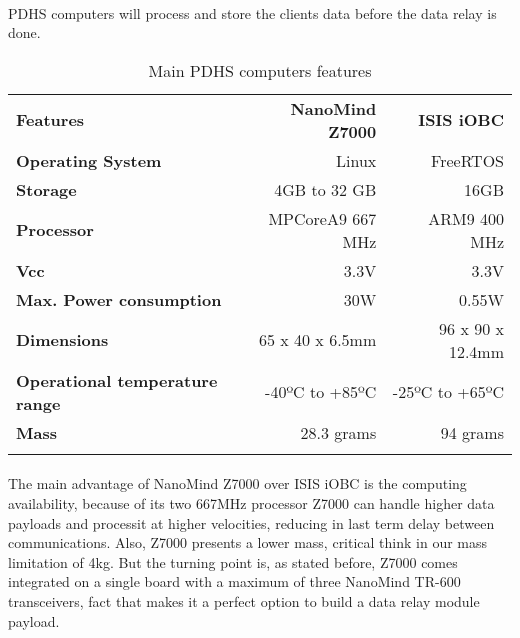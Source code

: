 \paragraph{} PDHS computers will process and store the clients data before the data relay is done.

\begin{longtable}{| l | r | r |}
	
	\hline
	\rowcolor[gray]{0.60} \multicolumn{3}{|c|}{\textbf{PDHS computers options}}\\
	\hline
		
	\hline
	\rowcolor[gray]{0.75}	\textbf{Features} &  \textbf{NanoMind Z7000} & \textbf{ISIS iOBC} \\
	\hline
		
	\cellcolor[gray]{0.85} \textbf{Operating System} & Linux  & FreeRTOS\\
	\cellcolor[gray]{0.85} \textbf{Storage} & 4GB to 32 GB& 16GB\\
	\cellcolor[gray]{0.85} \textbf{Processor} & MPCoreA9 667 MHz& ARM9 400 MHz\\
	\cellcolor[gray]{0.85} \textbf{Vcc} & 3.3V&3.3V \\
	\cellcolor[gray]{0.85} \textbf{Max. Power consumption} & 30W& 0.55W\\
	\cellcolor[gray]{0.85} \textbf{Dimensions} & 65 x 40 x 6.5mm & 96 x 90 x 12.4mm\\
	\cellcolor[gray]{0.85} \textbf{Operational temperature range} & -40ºC to +85ºC & -25ºC to +65ºC\\
	\cellcolor[gray]{0.85} \textbf{Mass} & 28.3 grams&94 grams \\
	\hline
		
		\caption{Main PDHS computers features}
		\label{computers}
		
	\end{longtable}
	\paragraph{}The main advantage of NanoMind Z7000 over ISIS iOBC is the computing availability, because of its two 667MHz processor Z7000 can handle higher data payloads and processit at higher velocities, reducing in last term delay between communications. Also, Z7000 presents a lower mass, critical think in our mass limitation of 4kg. But the turning point is, as stated before, Z7000 comes integrated on a single board with a maximum of three NanoMind TR-600 transceivers, fact that makes it a perfect option to build a data relay module payload.
